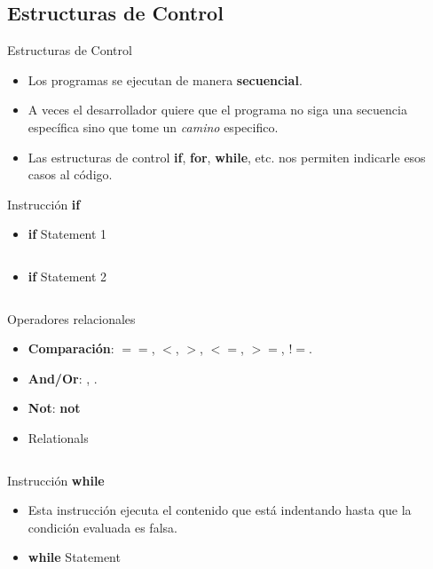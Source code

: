 \documentclass[usenames, dvipsnames, compress]{beamer}
\begin{document}
	\subsection{Estructuras de Control}
	\begin{frame}{Estructuras de Control}
		\begin{itemize}[<+- | alert@ +>]{}
			\item Los programas se ejecutan de manera \textbf{secuencial}.
			\item A veces el desarrollador quiere que el programa no siga una secuencia específica sino que tome un \textit{camino} especifico.
			\item Las estructuras de control \textbf{if}, \textbf{for}, \textbf{while}, etc. nos permiten indicarle esos casos al código. 
		\end{itemize}
	\end{frame}
	\begin{frame}[allowframebreaks]{Instrucción \textbf{if}}
	\begin{itemize}
		\item [] \begin{block}{\textbf{if} Statement 1}
			\inputminted[xleftmargin=\parindent,linenos]{python}{codes/if_statement.m}
		\end{block}
		\pause
		\item [] \begin{block}{\textbf{if} Statement 2}
			\inputminted[xleftmargin=\parindent,linenos]{python}{codes/if_statement2.m}
		\end{block}
	\end{itemize}
	\end{frame}
	\begin{frame}{Operadores relacionales}
	\begin{itemize}
		\item \textbf{Comparación}: $==$, $<$, $>$, $<=$, $>=$, $!=$.
		\pause
		\item \textbf{And/Or}: , .
		\pause
		\item \textbf{Not}: \textbf{not}
		\pause
		\item [] \begin{block}{Relationals}
			\inputminted[xleftmargin=\parindent,linenos]{python}{codes/relational.m}
		\end{block}
	\end{itemize}
	\end{frame}
	\begin{frame}{Instrucción \textbf{while}}
	\begin{itemize}
		\item Esta instrucción ejecuta el contenido que está indentando hasta que la condición evaluada es falsa.
		\pause
		\item [] \begin{block}{\textbf{while} Statement}
			\inputminted[xleftmargin=\parindent,linenos]{python}{codes/while_statement.m}
		\end{block}
	\end{itemize}
	\end{frame}
\end{document}
